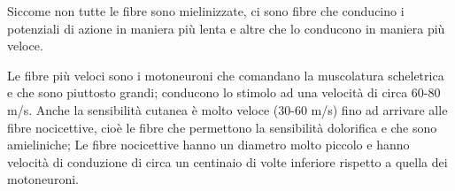 \documentclass[]{article}
\begin{document}
Siccome non tutte le fibre sono mielinizzate, ci sono fibre che
conducino i potenziali di azione in maniera più lenta e altre che lo
conducono in maniera più veloce.

Le fibre più veloci sono i motoneuroni che comandano la muscolatura
scheletrica e che sono piuttosto grandi; conducono lo stimolo ad una
velocità di circa 60-80 m/s. Anche la sensibilità cutanea è molto veloce
(30-60 m/s) fino ad arrivare alle fibre nocicettive, cioè le fibre che
permettono la sensibilità dolorifica e che sono amieliniche; Le fibre
nocicettive hanno un diametro molto piccolo e hanno velocità di
conduzione di circa un centinaio di volte inferiore rispetto a quella
dei motoneuroni.
\end{document}
